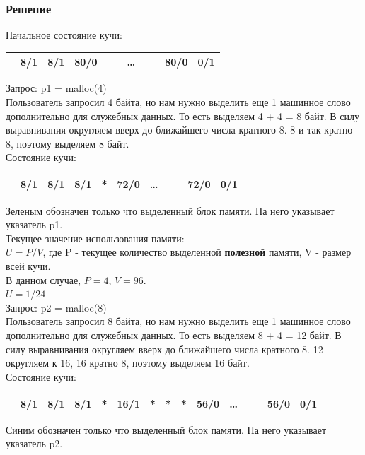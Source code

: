 \documentclass[12pt, letterpaper]{article}
\begin{document}
\subsubsection{Решение}
Начальное состояние кучи:
\begin{center}
    \begin{tabular}{|c|c|c|c|c|c|c|c|c|c|c|}
        \hline
         \cellcolor{black} & \cellcolor[gray]{0.9} 8/1 & \cellcolor[gray]{0.9} 8/1 & 80/0 & & & \dots & & & 80/0 & 0/1 \\
        \hline
    \end{tabular}
\end{center}
Запрос: p1 = malloc(4)\\
Пользователь запросил 4 байта, но нам нужно выделить еще 1 машинное слово дополнительно для служебных данных. То есть выделяем 4 + 4 = 8 байт. В силу выравнивания округляем вверх до ближайшего числа кратного 8. 8 и так кратно 8, поэтому выделяем 8 байт.\\
Состояние кучи:
\begin{center}
    \begin{tabular}{|c|c|c|c|c|c|c|c|c|c|c|}
        \hline
         \cellcolor{black} & \cellcolor[gray]{0.9} 8/1 & \cellcolor[gray]{0.9} 8/1 &\cellcolor{green!=40} 8/1 &\cellcolor{green!=40}*&72/0 & \dots & & & 72/0 & 0/1 \\
        \hline
    \end{tabular}
\end{center}
Зеленым обозначен только что выделенный блок памяти. На него указывает указатель p1.\\
Текущее значение использования памяти:\\
$U=P/V$, где P - текущее количество выделенной \textbf{полезной} памяти, V - размер всей кучи.\\
В данном случае, $P=4$, $V=96$.\\ 
$U=1/24$\\

Запрос: p2 = malloc(8)\\
Пользователь запросил 8 байта, но нам нужно выделить еще 1 машинное слово дополнительно для служебных данных. То есть выделяем 8 + 4 = 12 байт. В силу выравнивания округляем вверх до ближайшего числа кратного 8. 12 округляем к 16, 16 кратно 8, поэтому выделяем 16 байт.\\
Состояние кучи:
\begin{center}
    \begin{tabular}{|c|c|c|c|c|c|c|c|c|c|c|c|c|c|c|}
        \hline
         \cellcolor{black} & \cellcolor[gray]{0.9} 8/1 & \cellcolor[gray]{0.9} 8/1 &\cellcolor{green!=40} 8/1 &\cellcolor{green!=40}*&\cellcolor{blue!=40} 16/1 & \cellcolor{blue!=40}*& \cellcolor{blue!=40}*& \cellcolor{blue!=40}*&56/0& \dots & & & 56/0 & 0/1 \\
        \hline
    \end{tabular}
\end{center}
Синим обозначен только что выделенный блок памяти. На него указывает указатель p2.\\
\end{document}
